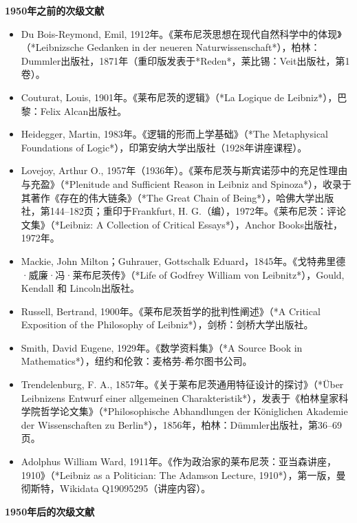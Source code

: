 \textbf{1950年之前的次级文献 } 
\begin{itemize}
\item Du Bois-Reymond, Emil, 1912年。《莱布尼茨思想在现代自然科学中的体现》（*Leibnizsche Gedanken in der neueren Naturwissenschaft*），柏林：Dummler出版社，1871年（重印版发表于*Reden*，莱比锡：Veit出版社，第1卷）。  
\item Couturat, Louis, 1901年。《莱布尼茨的逻辑》（*La Logique de Leibniz*），巴黎：Felix Alcan出版社。  
\item Heidegger, Martin, 1983年。《逻辑的形而上学基础》（*The Metaphysical Foundations of Logic*），印第安纳大学出版社（1928年讲座课程）。  
\item Lovejoy, Arthur O., 1957年（1936年）。《莱布尼茨与斯宾诺莎中的充足性理由与充盈》（*Plenitude and Sufficient Reason in Leibniz and Spinoza*），收录于其著作《存在的伟大链条》（*The Great Chain of Being*），哈佛大学出版社，第144–182页；重印于Frankfurt, H. G.（编），1972年。《莱布尼茨：评论文集》（*Leibniz: A Collection of Critical Essays*），Anchor Books出版社，1972年。  
\item  Mackie, John Milton；Guhrauer, Gottschalk Eduard，1845年。《戈特弗里德·威廉·冯·莱布尼茨传》（*Life of Godfrey William von Leibnitz*），Gould, Kendall 和 Lincoln出版社。  
\item Russell, Bertrand, 1900年。《莱布尼茨哲学的批判性阐述》（*A Critical Exposition of the Philosophy of Leibniz*），剑桥：剑桥大学出版社。  
\item Smith, David Eugene, 1929年。《数学资料集》（*A Source Book in Mathematics*），纽约和伦敦：麦格劳-希尔图书公司。  
\item Trendelenburg, F. A., 1857年。《关于莱布尼茨通用特征设计的探讨》（*Über Leibnizens Entwurf einer allgemeinen Charakteristik*），发表于《柏林皇家科学院哲学论文集》（*Philosophische Abhandlungen der Königlichen Akademie der Wissenschaften zu Berlin*），1856年，柏林：Dümmler出版社，第36–69页。  
\item Adolphus William Ward, 1911年。《作为政治家的莱布尼茨：亚当森讲座，1910》（*Leibniz as a Politician: The Adamson Lecture, 1910*），第一版，曼彻斯特，Wikidata Q19095295（讲座内容）。  
\end{itemize}
\textbf{1950年后的次级文献}
